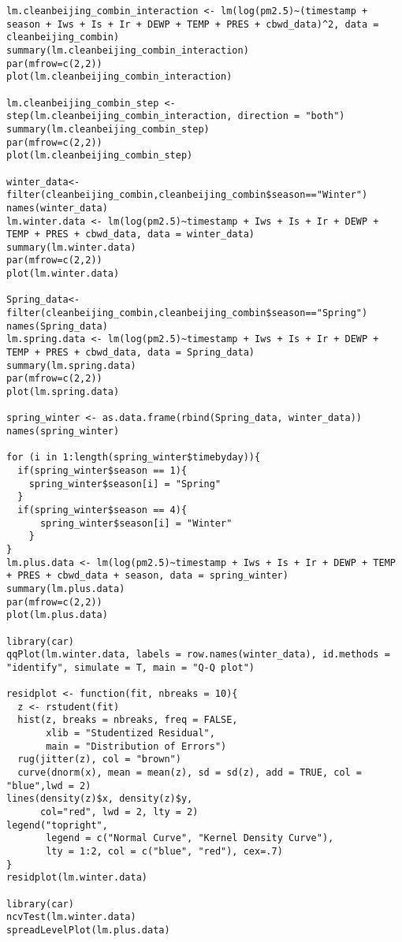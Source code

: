 \begin{verbatim}
lm.cleanbeijing_combin_interaction <- lm(log(pm2.5)~(timestamp + season + Iws + Is + Ir + DEWP + TEMP + PRES + cbwd_data)^2, data = cleanbeijing_combin)
summary(lm.cleanbeijing_combin_interaction)
par(mfrow=c(2,2))
plot(lm.cleanbeijing_combin_interaction)

lm.cleanbeijing_combin_step <- step(lm.cleanbeijing_combin_interaction, direction = "both")
summary(lm.cleanbeijing_combin_step)
par(mfrow=c(2,2))
plot(lm.cleanbeijing_combin_step)

winter_data<-filter(cleanbeijing_combin,cleanbeijing_combin$season=="Winter")
names(winter_data)
lm.winter.data <- lm(log(pm2.5)~timestamp + Iws + Is + Ir + DEWP + TEMP + PRES + cbwd_data, data = winter_data)
summary(lm.winter.data)
par(mfrow=c(2,2))
plot(lm.winter.data)

Spring_data<-filter(cleanbeijing_combin,cleanbeijing_combin$season=="Spring")
names(Spring_data)
lm.spring.data <- lm(log(pm2.5)~timestamp + Iws + Is + Ir + DEWP + TEMP + PRES + cbwd_data, data = Spring_data)
summary(lm.spring.data)
par(mfrow=c(2,2))
plot(lm.spring.data)

spring_winter <- as.data.frame(rbind(Spring_data, winter_data))
names(spring_winter)

for (i in 1:length(spring_winter$timebyday)){
  if(spring_winter$season == 1){
    spring_winter$season[i] = "Spring"
  }
  if(spring_winter$season == 4){
      spring_winter$season[i] = "Winter"
    }
}
lm.plus.data <- lm(log(pm2.5)~timestamp + Iws + Is + Ir + DEWP + TEMP + PRES + cbwd_data + season, data = spring_winter)
summary(lm.plus.data)
par(mfrow=c(2,2))
plot(lm.plus.data)

library(car)
qqPlot(lm.winter.data, labels = row.names(winter_data), id.methods = "identify", simulate = T, main = "Q-Q plot")

residplot <- function(fit, nbreaks = 10){
  z <- rstudent(fit)
  hist(z, breaks = nbreaks, freq = FALSE,
       xlib = "Studentized Residual",
       main = "Distribution of Errors")
  rug(jitter(z), col = "brown")
  curve(dnorm(x), mean = mean(z), sd = sd(z), add = TRUE, col = "blue",lwd = 2)
lines(density(z)$x, density(z)$y,
      col="red", lwd = 2, lty = 2)
legend("topright",
       legend = c("Normal Curve", "Kernel Density Curve"),
       lty = 1:2, col = c("blue", "red"), cex=.7)
}
residplot(lm.winter.data)

library(car)
ncvTest(lm.winter.data)
spreadLevelPlot(lm.plus.data)
\end{verbatim}
